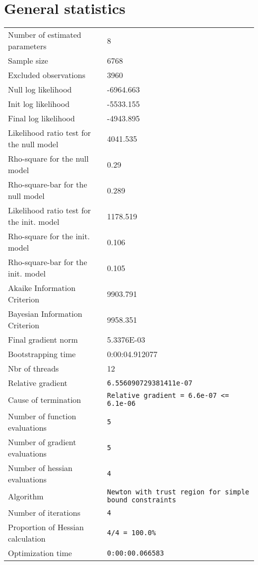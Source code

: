 \section{General statistics}
\begin{tabular}{ll}
Number of estimated parameters & 8 \\
Sample size & 6768 \\
Excluded observations & 3960 \\
Null log likelihood & -6964.663 \\
Init log likelihood & -5533.155 \\
Final log likelihood & -4943.895 \\
Likelihood ratio test for the null model & 4041.535 \\
Rho-square for the null model & 0.29 \\
Rho-square-bar for the null model & 0.289 \\
Likelihood ratio test for the init. model & 1178.519 \\
Rho-square for the init. model & 0.106 \\
Rho-square-bar for the init. model & 0.105 \\
Akaike Information Criterion & 9903.791 \\
Bayesian Information Criterion & 9958.351 \\
Final gradient norm & 5.3376E-03 \\
Bootstrapping time & 0:00:04.912077 \\
Nbr of threads & 12 \\
Relative gradient & \verb$6.556090729381411e-07$ \\
Cause of termination & \verb$Relative gradient = 6.6e-07 <= 6.1e-06$ \\
Number of function evaluations & \verb$5$ \\
Number of gradient evaluations & \verb$5$ \\
Number of hessian evaluations & \verb$4$ \\
Algorithm & \verb$Newton with trust region for simple bound constraints$ \\
Number of iterations & \verb$4$ \\
Proportion of Hessian calculation & \verb$4/4 = 100.0%$ \\
Optimization time & \verb$0:00:00.066583$ \\
\end{tabular}

